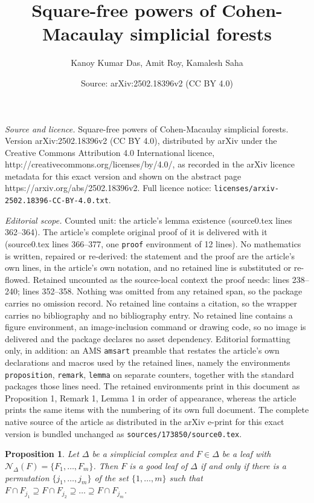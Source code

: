 \documentclass[10pt,a4paper]{amsart}
\title{Square-free powers of Cohen-Macaulay simplicial forests}
\author{Kanoy Kumar Das, Amit Roy, Kamalesh Saha}
\date{Source: arXiv:2502.18396v2 (CC BY 4.0)}
\newtheorem{proposition}{Proposition}
\def\D{\Delta}
\def\N{\mathcal{N}}
\begin{document}
\maketitle

\noindent\emph{Source and licence.} Square-free powers of Cohen-Macaulay simplicial forests. Version arXiv:2502.18396v2 (CC BY 4.0), distributed by arXiv under the Creative Commons Attribution 4.0 International licence, http://creativecommons.org/licenses/by/4.0/, as recorded in the arXiv licence metadata for this exact version and shown on the abstract page https://arxiv.org/abs/2502.18396v2. Full licence notice: \texttt{licenses/arxiv-2502.18396-CC-BY-4.0.txt}.\par\smallskip

\noindent\textit{Editorial scope.} Counted unit: the article's lemma existence (source0.tex lines 362--364). The article's complete original proof of it is delivered with it (source0.tex lines 366--377, one \texttt{proof} environment of 12 lines). No mathematics is written, repaired or re-derived: the statement and the proof are the article's own lines, in the article's own notation, and no retained line is substituted or re-flowed.  Retained uncounted as the source-local context the proof needs: lines 238--240; lines 352--358.  Nothing was omitted from any retained span, so the package carries no omission record.  No retained line contains a citation, so the wrapper carries no bibliography and no bibliography entry.  No retained line contains a figure environment, an image-inclusion command or drawing code, so no image is delivered and the package declares no asset dependency.  Editorial formatting only, in addition: an AMS \texttt{amsart} preamble that restates the article's own declarations and macros used by the retained lines, namely the environments \texttt{proposition}, \texttt{remark}, \texttt{lemma} on separate counters, together with the standard packages those lines need.  The retained environments print in this document as Proposition 1, Remark 1, Lemma 1 in order of appearance, whereas the article prints the same items with the numbering of its own full document.  The complete native source of the article as distributed in the arXiv e-print for this exact version is bundled unchanged as \texttt{sources/173850/source0.tex}.
\begin{proposition}\label{goof leaf prop}
    Let $\D$ be a simplicial complex and $F\in \D$ be a leaf with $\N_{\D}(F)=\{F_1,\ldots , F_m\}$. Then $F$ is a good leaf of $\D$ if and only if there is a permutation $\{j_1,\ldots,j_m\}$ of the set $\{1,\ldots,m\}$ such that $F\cap F_{j_1}\supseteq F\cap F_{j_2}\supseteq\dots\supseteq F\cap F_{j_m}$.
\end{proposition}
\end{document}
